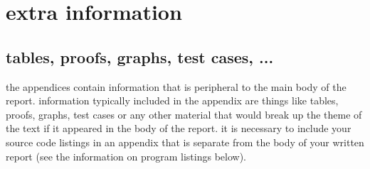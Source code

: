 \chapter{extra information}
\section{tables, proofs, graphs, test cases, ...}
the appendices contain information that is peripheral to the main body of the report. information typically included in the appendix are things like tables, proofs, graphs, test cases or any other material that would break up the theme of the text if it appeared in the body of the report. it is necessary to include your source code listings in an appendix that is separate from the body of your written report (see the information on program listings below).

